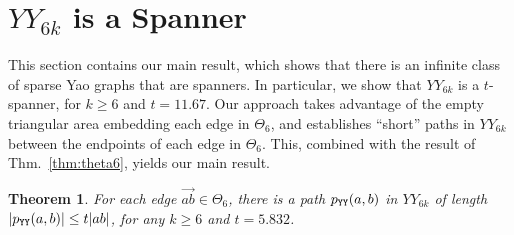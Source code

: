 \documentclass[11pt]{article}
\newcommand\pyy{p_{{\tt YY}}}
\newcommand{\arr}[1]{\overrightarrow{#1}}
\newtheorem{theorem}{{\bf Theorem}}
\begin{document}
\section{$YY_{6k}$ is a Spanner}
\label{sec:main}
This section contains our main result, which shows that there is an infinite class of sparse Yao graphs that are spanners. In particular, we show that $YY_{6k}$ is a $t$-spanner, for $k \ge 6$ and $t = 11.67$. Our approach takes advantage of the empty triangular area embedding each edge in $\Theta_6$, and establishes ``short'' paths in $YY_{6k}$ between the endpoints of each edge in $\Theta_6$. This, combined with the result of Thm.~\ref{thm:theta6}, yields our main result.

\begin{theorem}
For each edge $\arr{ab} \in \Theta_6$, there is a path $\pyy(a, b)$ in $YY_{6k}$ of length
$|\pyy(a, b)| \le t|ab|$, for any $k \ge 6$ and $t = 5.832$.
\label{thm:maintheta}
\end{theorem}
\end{document}

